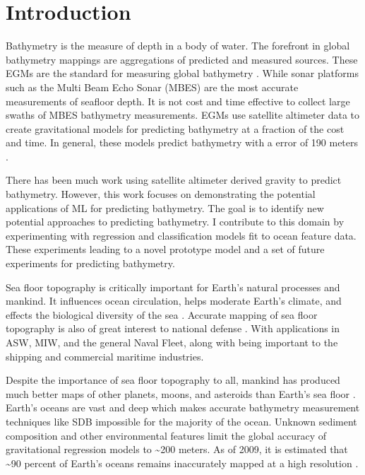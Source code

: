 
\section{Introduction}
\setlength{\parindent}{10ex}
Bathymetry is the measure of depth in a body of water.
The forefront in global bathymetry mappings are aggregations of predicted and measured sources. 
These \ac{EGM}s are the standard for measuring global bathymetry \cite{becker2009global}\cite{smith1994bathymetric}\cite{smith1997global}\cite{smith2010planning}.
While sonar platforms such as the Multi Beam Echo Sonar (MBES) \cite{farr1980multibeam} are the most accurate measurements of seafloor depth.
It is not cost and time effective to collect large swaths of \ac{MBES} bathymetry measurements.
\ac{EGM}s use satellite altimeter data to create gravitational models for predicting bathymetry at a fraction of the cost and time.
In general, these models predict bathymetry with a error of 190 meters \cite{jena2012prediction}.

\par
There has been much work using satellite altimeter derived gravity to predict bathymetry.
However, this work focuses on demonstrating the potential applications of \ac{ML} for predicting bathymetry.
The goal is to identify new potential approaches to predicting bathymetry.
I contribute to this domain by experimenting with regression and classification models fit to ocean feature data.
These experiments leading to a novel prototype model and a set of future experiments for predicting bathymetry.




Sea floor topography is critically important for Earth's natural processes and mankind.
It influences ocean circulation, helps moderate Earth's climate, and effects the biological diversity of the sea \cite{kunze2004role}.
Accurate mapping of sea floor topography is also of great interest to national defense \cite{goodman1982defence}.
With applications in \ac{ASW}, \ac{MIW}, and the general Naval Fleet, along with being important to the shipping and commercial maritime industries.

\par
Despite the importance of sea floor topography to all, mankind has produced much better maps of other planets, moons, and asteroids than Earth's sea floor \cite{becker2009global}.
Earth's oceans are vast and deep which makes accurate bathymetry measurement techniques like \ac{SDB} impossible for the majority of the ocean.
Unknown sediment composition and other environmental features limit the global accuracy of gravitational regression models to \~{}200 meters.
As of 2009, it is estimated that \~{}90 percent of Earth's oceans remains inaccurately mapped at a high resolution \cite{becker2009global}.

